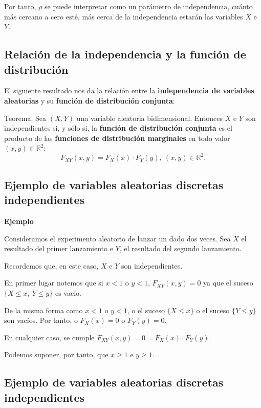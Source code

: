 \documentclass[]{book}
\begin{document}
Por tanto, \(\rho\) se puede interpretar como un parámetro de independencia, cuánto más cercano a cero esté, más cerca de la independencia estarán las variables \(X\) e \(Y\).

\hypertarget{relaciuxf3n-de-la-independencia-y-la-funciuxf3n-de-distribuciuxf3n}{%
\subsection{Relación de la independencia y la función de distribución}\label{relaciuxf3n-de-la-independencia-y-la-funciuxf3n-de-distribuciuxf3n}}

El siguiente resultado nos da la relación entre la \textbf{independencia de variables aleatorias} y su \textbf{función de distribución conjunta}:

Teorema.
Sea \((X,Y)\) una variable aleatoria bidimensional. Entonces
\(X\) e \(Y\) son independientes si, y sólo si, la \textbf{función de distribución conjunta} es el producto de las \textbf{funciones de distribución marginales} en todo valor \((x,y)\in\mathbb{R}^2\):
\[
F_{XY}(x,y)=F_X(x)\cdot F_Y(y),\ (x,y)\in\mathbb{R}^2.
\]

\hypertarget{ejemplo-de-variables-aleatorias-discretas-independientes}{%
\subsection{Ejemplo de variables aleatorias discretas independientes}\label{ejemplo-de-variables-aleatorias-discretas-independientes}}

\textbf{Ejemplo}

Consideramos el experimento aleatorio de lanzar un dado dos veces. Sea \(X\) el resultado del primer lanzamiento e \(Y\), el resultado del segundo lanzamiento.

Recordemos que, en este caso, \(X\) e \(Y\) son independientes.

En primer lugar notemos que si \(x<1\) o \(y<1\), \(F_{XY}(x,y)=0\) ya que el suceso \(\{X\leq x,\ Y\leq y\}\) es vacío.

De la misma forma como \(x<1\) o \(y<1\), o el suceso \(\{X\leq x\}\) o el suceso \(\{Y\leq y\}\) son vacíos. Por tanto, o \(F_X(x)=0\) o \(F_Y(y)=0\).

En cualquier caso, se cumple \(F_{XY}(x,y)=0=F_X(x)\cdot F_Y(y)\).

Podemos suponer, por tanto, que \(x\geq 1\) e \(y\geq 1\).

\hypertarget{ejemplo-de-variables-aleatorias-discretas-independientes-1}{%
\subsection{Ejemplo de variables aleatorias discretas independientes}\label{ejemplo-de-variables-aleatorias-discretas-independientes-1}}
\end{document}
